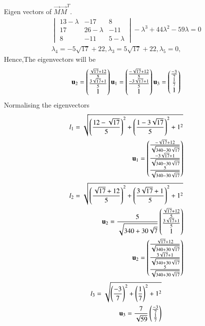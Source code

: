 \documentclass[journal,12pt,twocolumn]{IEEEtran}
\begin{document}
Eigen vectors of $\vec{M}$$\vec{M}^T.$
\begin{align}
\begin{vmatrix}
13-\lambda&-17&8\\17&26-\lambda&-11\\8&-11&5-\lambda
\end{vmatrix}
-\lambda^3+44\lambda^2-59\lambda=0\\
\lambda_4=-5\sqrt{17}+22,\lambda_3=5\sqrt{17}+22,\lambda_5=0,
\end{align}
Hence,The eigenvectors will be
\begin{align}
\mathbf{u}_2=\begin{pmatrix}\frac{\sqrt{17}+12}{5}\\\frac{3\sqrt{17}+1}{5}\\1\end{pmatrix}
\mathbf{u}_1=\begin{pmatrix}\frac{-\sqrt{17}+12}{5}\\\frac{-3\sqrt{17}+1}{5}\\1\end{pmatrix}
\mathbf{u}_3=\begin{pmatrix}\frac{-3}{7}\\\frac{1}{7}\\1\end{pmatrix}
\end{align}
Normalising the eigenvectors
\begin{align}
l_1=\sqrt{{\left(\frac{12-\sqrt{17}}{5}\right)}^2+{\left(\frac{1-3\sqrt{17}}{5}\right)}^2+1^2}\\
\mathbf{u}_1=\begin{pmatrix}\frac{-\sqrt{17}+12}{\sqrt{340-30\sqrt{17}}}\\\frac{-3\sqrt{17}+1}{\sqrt{340-30\sqrt{17}}}\\\frac{5}{\sqrt{340-30\sqrt{17}}}\end{pmatrix}\\
\end{align}
\begin{align}
l_2=\sqrt{\left({\frac{\sqrt{17}+12}{5}}\right)^2+\left({\frac{3\sqrt{17}+1}{5}}\right)^2+1^2}\\
\mathbf{u}_2=\frac{5}{\sqrt{340+30\sqrt{7}}}\begin{pmatrix}\frac{\sqrt{17}+12}{5}\\\frac{3\sqrt{17}+1}{5}\\1\end{pmatrix}\\
\mathbf{u}_2=\begin{pmatrix}\frac{\sqrt{17}+12}{\sqrt{340+30\sqrt{17}}}\\\frac{3\sqrt{17}+1}{\sqrt{340+30\sqrt{17}}}\\\frac{5}{\sqrt{340+30\sqrt{17}}}\end{pmatrix}
\end{align}
\begin{align}
l_3=\sqrt{\left({\frac{-3}{7}}\right)^2+\left({\frac{1}{7}}\right)^2+1^2}\\
\vec{u}_3=\frac{7}{\sqrt{59}}\myvec{\frac{-3}{7}\\\frac{1}{7}}\\

\end{align}$$
\end{document}
